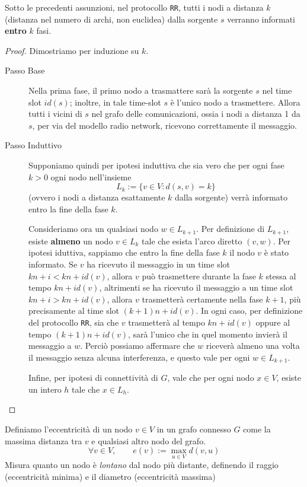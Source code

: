 \begin{teorema}[Correttezza]
    Sotto le precedenti assunzioni, nel protocollo \texttt{RR}, tutti i nodi a distanza $k$ (distanza nel numero di archi, non euclidea) dalla sorgente $s$ verranno informati \textbf{entro} $k$ fasi.
    \begin{proof}
        Dimostriamo per induzione su $k$.
        \begin{description}
            \item[Passo Base] Nella prima fase, il primo nodo a trasmattere sarà la sorgente $s$ nel time slot $id(s)$; inoltre, in tale time-slot $s$ è l'unico nodo a trasmettere. Allora tutti i vicini di $s$ nel grafo delle comunicazioni, ossia i nodi a distanza 1 da $s$, per via del modello radio network, ricevono correttamente il messaggio.
            \item[Passo Induttivo] Supponiamo quindi per ipotesi induttiva che sia vero che per ogni fase $k > 0$ ogni nodo nell'insieme
            \[
                L_k := \{v \in V: d(s, v) = k\}
            \]
            (ovvero i nodi a distanza esattamente $k$ dalla sorgente) verrà informato entro la fine della fase $k$.

            Consideriamo ora un qualsiasi nodo $w \in L_{k+1}$. Per definizione di $L_{k+1}$, esiste \textbf{almeno} un nodo $v \in L_k$ tale che esista l'arco diretto $(v, w)$. Per ipotesi iduttiva, sappiamo che entro la fine della fase $k$ il nodo $v$ è stato informato. Se $v$ ha ricevuto il messaggio in un time slot $kn + i < kn + id(v)$, allora $v$ può trasmettere durante la fase $k$ stessa al tempo $kn + id(v)$, altrimenti se ha ricevuto il messaggio a un time slot $kn + i > kn + id(v)$, allora $v$ trasmetterà certamente nella fase $k + 1$, più precisamente al time slot $(k+1)n + id(v)$. In ogni caso, per definizione del protocollo \texttt{RR}, sia che $v$ trasmetterà al tempo $kn + id(v)$ oppure al tempo $(k+1)n + id(v)$, sarà l'unico che in quel momento invierà il messaggio a $w$. Perciò possiamo affermare che $w$ riceverà almeno una volta il messaggio senza alcuna interferenza, e questo vale per ogni $w \in L_{k+1}$.
        
            Infine, per ipotesi di connettività di $G$, vale che per ogni nodo $x \in V$, esiste un intero $h$ tale che $x \in L_h$.
        \end{description}
    \end{proof}
\end{teorema}

\begin{definizione}[Eccentricità]
    Definiamo l'eccentricità di un nodo $v \in V$ in un grafo connesso $G$ come la massima distanza tra $v$ e qualsiasi altro nodo del grafo. 
    \[
        \forall v \in V, \qquad e(v) := \max_{u \in V}d(v, u)
    \]
    Misura quanto un nodo è \textit{lontano} dal nodo più distante, definendo il raggio (eccentricità minima) e il diametro (eccentricità massima)
\end{definizione}


